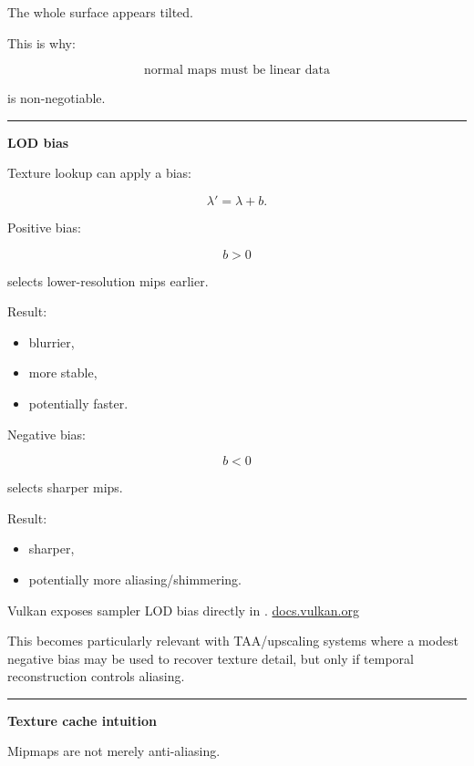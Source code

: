 The whole surface appears tilted.

This is why:

\[
\boxed{\text{normal maps must be linear data}}
\]

is non-negotiable.

\begin{center}\rule{0.5\linewidth}{0.5pt}\end{center}

\textbf{LOD bias}

Texture lookup can apply a bias:

\[
\lambda'=\lambda+b.
\]

Positive bias:

\[
b>0
\]

selects lower-resolution mips earlier.

Result:

\begin{itemize}
\tightlist
\item
  blurrier,
\item
  more stable,
\item
  potentially faster.
\end{itemize}

Negative bias:

\[
b<0
\]

selects sharper mips.

Result:

\begin{itemize}
\tightlist
\item
  sharper,
\item
  potentially more aliasing/shimmering.
\end{itemize}

Vulkan exposes sampler LOD bias directly in . \href{https://docs.vulkan.org/spec/latest/chapters/samplers.html?utm_source=chatgpt.com}{docs.vulkan.org}

This becomes particularly relevant with TAA/upscaling systems where a modest negative bias may be used to recover texture detail, but only if temporal reconstruction controls aliasing.

\begin{center}\rule{0.5\linewidth}{0.5pt}\end{center}

\textbf{Texture cache intuition}

Mipmaps are not merely anti-aliasing.

